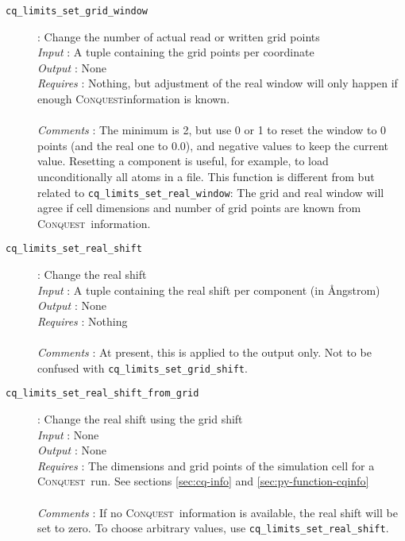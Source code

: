 \documentclass[a4paper,notitlepage,11pt]{article}
\def\CQ{\textsc{Conquest}}
\begin{document}
\begin{description}
\item[\texttt{cq\_limits\_set\_grid\_window}]: Change the number of actual read or written grid points\\
  \emph{Input} : A tuple containing the grid points per coordinate\\
  \emph{Output} : None\\
  \emph{Requires} : Nothing, but adjustment of the real window will only
  happen if enough \CQ information is known.\\
  \\
  \emph{Comments} : The minimum is 2, but use 0 or 1 to
  reset the window to 0 points (and the real one to 0.0), and negative values to
  keep the current value. Resetting a component is useful, for example, to load
  unconditionally all atoms in a file. This function is different from but
  related to \texttt{cq\_limits\_set\_real\_window}: The grid and real window
  will agree if cell dimensions and number of grid points are known from 
  \CQ\ information.
\end{description}

\begin{description}
\item[\texttt{cq\_limits\_set\_real\_shift}]: Change the real shift\\
  \emph{Input} : A tuple containing the real shift per component (in \AA ngstrom)\\
  \emph{Output} : None\\
  \emph{Requires} : Nothing\\
  \\
  \emph{Comments} : At present, this is applied to the output only.
  Not to be confused with \texttt{cq\_limits\_set\_grid\_shift}.
\end{description}

\begin{description}
\item[\texttt{cq\_limits\_set\_real\_shift\_from\_grid}]: Change the real shift using the grid shift\\
  \emph{Input} : None\\
  \emph{Output} : None\\
  \emph{Requires} : The dimensions and grid points of the simulation cell for a \CQ\ run. 
  See sections \ref{sec:cq-info} and \ref{sec:py-function-cqinfo}\\
  \\
  \emph{Comments} : If no \CQ\ information is available, the real shift will
  be set to zero. To choose arbitrary values, use
  \texttt{cq\_limits\_set\_real\_shift}.
\end{description}
\end{document}
